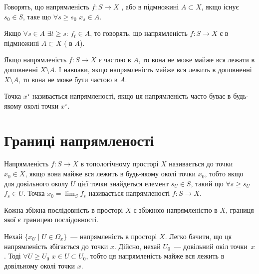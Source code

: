 \begin{definition}
    Говорять, що напрямленість $f : S \to X$ , або  в підмножині $A \subset X$, якщо існує $s_0 \in S$, таке що $\forall s \ge s_0$ $x_s \in A$.
\end{definition}

\begin{definition}
    Якщо $\forall s \in A$ $\exists t \ge s$: $f_t \in A$, то говорять, що напрямленість $f: S \to X$ є  в підмножині $A \subset X$ ( в $A$).
\end{definition}

\begin{remark}
    Якщо напрямленість $f: S \to X$ є частою в $A$, то вона не може майже вся лежати в доповненні $X \setminus A$. І навпаки, якщо напрямленість майже вся лежить в доповненні $X \setminus A$, то вона не може бути частою в $A$.
\end{remark}

\begin{definition}
    Точка $x^\star$ називається  напрямленості, якщо ця напрямленість часто буває в будь-якому околі точки $x^\star$.
\end{definition}

\section{Границі напрямленості}

\begin{definition}
    Напрямленість $f: S \to X$ в топологічному просторі $X$ називається  до точки $x_0 \in X$, якщо вона майже вся лежить в будь-якому околі точки $x_0$, тобто якщо для довільного околу $U$ цієї точки знайдеться елемент $s_U \in S$, такий що $\forall s \ge s_U$ $f_s \in U$. Точка $x_0 = \lim_S f_s$ називається  напрямленості $f: S \to X$.
\end{definition}

\begin{example}
    Кожна збіжна послідовність в просторі $X$ є збіжною напрямленістю в $X$, границя якої є границею послідовності.
\end{example}

\begin{example}
    Нехай $\{x_U \mid U \in \Omega_x\}$~--- напрямленість в просторі $X$. Легко бачити, що ця напрямленість збігається до точки $x$. Дійсно, нехай $U_0$~--- довільний окіл точки~$x$. Тоді $\forall U \ge U_0$ $x \in U \subset U_0$, тобто ця напрямленість майже вся лежить в довільному околі точки $x$.
\end{example}

